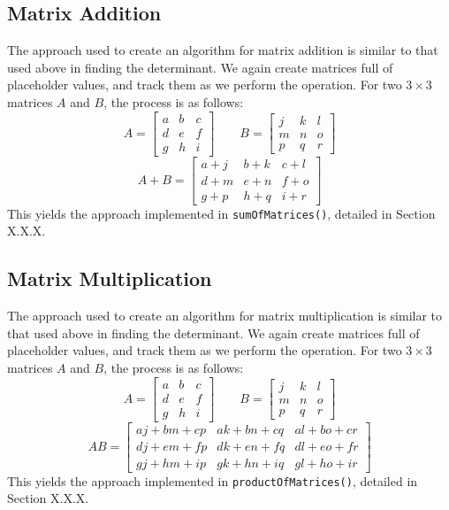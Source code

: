 \documentclass[12pt]{article}
\begin{document}
\subsection{Matrix Addition}
The approach used to create an algorithm for matrix addition is similar to that used above in finding the determinant. We again create matrices full of placeholder values, and track them as we perform the operation. For two $3\times3$ matrices $A$ and $B$, the process is as follows:
\[
A =
\begin{bmatrix}
    a & b & c \\
    d & e & f \\
    g & h & i
\end{bmatrix}
\qquad
B = 
\begin{bmatrix}
    j & k & l \\
    m & n & o \\
    p & q & r
\end{bmatrix}
\]
\begin{equation}
    A+B = 
    \begin{bmatrix}
    a + j & b + k & c + l \\
    d + m & e + n & f + o \\
    g + p & h + q & i + r
    \end{bmatrix}
\end{equation}
This yields the approach implemented in \texttt{sumOfMatrices()}, detailed in Section X.X.X.

\subsection{Matrix Multiplication}
The approach used to create an algorithm for matrix multiplication is similar to that used above in finding the determinant. We again create matrices full of placeholder values, and track them as we perform the operation. For two $3\times3$ matrices $A$ and $B$, the process is as follows:
\[
A =
\begin{bmatrix}
    a & b & c \\
    d & e & f \\
    g & h & i
\end{bmatrix}
\qquad
B = 
\begin{bmatrix}
    j & k & l \\
    m & n & o \\
    p & q & r
\end{bmatrix}
\]
\begin{equation}
    AB = 
    \begin{bmatrix}
    a j + b m + c p & a k + b n + c q & a l + b o + c r \\
    d j + e m + f p & d k + e n + f q & d l + e o + f r \\
    g j + h m + i p & g k + h n + i q & g l + h o + i r
    \end{bmatrix}
\end{equation}
This yields the approach implemented in \texttt{productOfMatrices()}, detailed in Section X.X.X.
\end{document}
